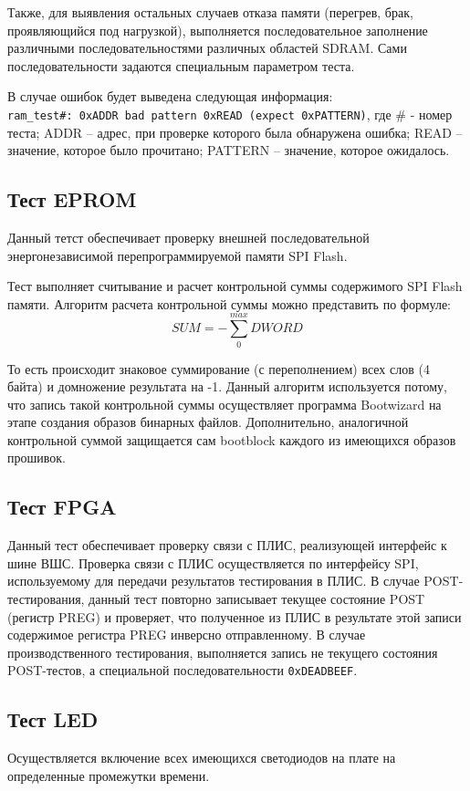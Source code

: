 \documentclass[a4paper,14pt,bachelor]{disser}
\begin{document}
Также, для выявления остальных случаев отказа памяти (перегрев, брак, проявляющийся под нагрузкой), выполняется последовательное заполнение различными последовательностями различных областей SDRAM. Сами последовательности задаются специальным параметром теста.

В случае ошибок будет выведена следующая информация:\\
\verb|ram_test#: 0xADDR bad pattern 0xREAD (expect 0xPATTERN)|, где \# - номер теста; ADDR -- адрес, при проверке которого была обнаружена ошибка; READ -- значение, которое было прочитано; PATTERN -- значение, которое ожидалось.

\subsection{Тест EPROM}
Данный тетст обеспечивает проверку внешней последовательной энергонезависимой перепрограммируемой памяти SPI Flash.

Тест выполняет считывание и расчет контрольной суммы содержимого SPI Flash памяти. Алгоритм расчета контрольной суммы можно представить по формуле: $$SUM=-\sum_0^{max}DWORD$$

То есть происходит знаковое суммирование (с переполнением) всех слов (4 байта) и домножение результата на -1. Данный алгоритм используется потому, что запись такой контрольной суммы осуществляет программа Bootwizard на этапе создания образов бинарных файлов. Дополнительно, аналогичной контрольной суммой защищается сам bootblock каждого из имеющихся образов прошивок.

\subsection{Тест FPGA}
Данный тест обеспечивает проверку связи с ПЛИС, реализующей интерфейс к шине ВШС. Проверка связи с ПЛИС осуществляется по интерфейсу SPI, используемому для передачи результатов тестирования в ПЛИС. В случае POST-тестирования, данный тест повторно записывает текущее состояние POST (регистр PREG) и проверяет, что полученное из ПЛИС в результате этой записи содержимое регистра PREG инверсно отправленному. В случае производственного тестирования, выполняется запись не текущего состояния POST-тестов, а специальной последовательности \texttt{0xDEADBEEF}.

\subsection{Тест LED}
Осуществляется включение всех имеющихся светодиодов на плате на определенные промежутки времени.
\end{document}
